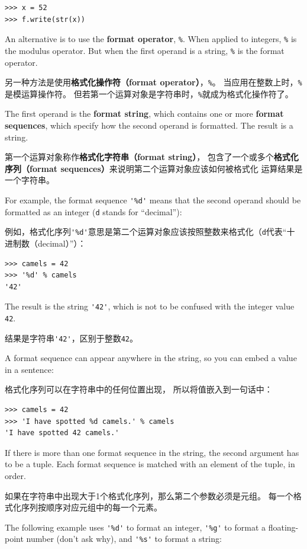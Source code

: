 \documentclass[10pt]{book}
\begin{document}
\begin{CJK}{UTF8}{gbsn}
\begin{verbatim}
>>> x = 52
>>> f.write(str(x))
\end{verbatim}
%
An alternative is to use the {\bf format operator}, {\tt \%}.  When
applied to integers, {\tt \%} is the modulus operator.  But
when the first operand is a string, {\tt \%} is the format operator.

另一种方法是使用{\bf 格式化操作符（format operator）}，{\tt \%}。
当应用在整数上时，{\tt \%}是模运算操作符。
但若第一个运算对象是字符串时，{\tt \%}就成为格式化操作符了。

The first operand is the {\bf format string}, which contains
one or more {\bf format sequences}, which
specify how
the second operand is formatted.  The result is a string.

第一个运算对象称作{\bf 格式化字符串（format string）}，
包含了一个或多个{\bf 格式化序列（format sequences）}来说明第二个运算对象应该如何被格式化
运算结果是一个字符串。

For example, the format sequence \verb"'%d'" means that
the second operand should be formatted as an
integer ({\tt d} stands for ``decimal''):

例如，格式化序列\verb"'%d'"意思是第二个运算对象应该按照整数来格式化（{\tt d}代表``十进制数（decimal）''）：

\begin{verbatim}
>>> camels = 42
>>> '%d' % camels
'42'
\end{verbatim}
%
The result is the string \verb"'42'", which is not to be confused
with the integer value {\tt 42}.

结果是字符串\verb"'42'"，区别于整数{\tt 42}。

A format sequence can appear anywhere in the string,
so you can embed a value in a sentence:

格式化序列可以在字符串中的任何位置出现，
所以将值嵌入到一句话中：

\begin{verbatim}
>>> camels = 42
>>> 'I have spotted %d camels.' % camels
'I have spotted 42 camels.'
\end{verbatim}
%
If there is more than one format sequence in the string,
the second argument has to be a tuple.  Each format sequence is
matched with an element of the tuple, in order.

如果在字符串中出现大于1个格式化序列，那么第二个参数必须是元组。
每一个格式化序列按顺序对应元组中的每一个元素。

The following example uses \verb"'%d'" to format an integer,
\verb"'%g'" to format
a floating-point number (don't ask why), and \verb"'%s'" to format
a string:


\end{CJK}
\end{document}
